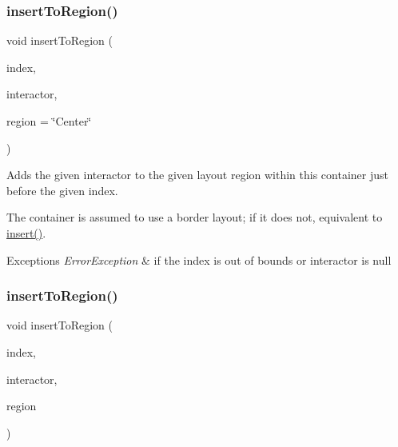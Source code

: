 \subsubsection{\texorpdfstring{insert\+To\+Region()}{insertToRegion()}\hspace{0.1cm}{\footnotesize\ttfamily [2/4]}}
{\footnotesize\ttfamily void insert\+To\+Region (\begin{DoxyParamCaption}\item[{int}]{index,  }\item[{\mbox{\hyperlink{classGInteractor}{G\+Interactor}} $\ast$}]{interactor,  }\item[{const std\+::string \&}]{region = {\ttfamily \char`\"{}Center\char`\"{}} }\end{DoxyParamCaption})\hspace{0.3cm}{\ttfamily [virtual]}}



Adds the given interactor to the given layout region within this container just before the given index. 

The container is assumed to use a border layout; if it does not, equivalent to \mbox{\hyperlink{classGContainer_afffb8f789ff9a8466fbae5b846a0ebe7}{insert()}}. 
\begin{DoxyExceptions}{Exceptions}
{\em Error\+Exception} & if the index is out of bounds or interactor is null \\
\hline
\end{DoxyExceptions}
\mbox{\label{classGContainer_a1be2b263cd8d28e61e136a19d8e935cc}} 
\subsubsection{\texorpdfstring{insert\+To\+Region()}{insertToRegion()}\hspace{0.1cm}{\footnotesize\ttfamily [3/4]}}
{\footnotesize\ttfamily void insert\+To\+Region (\begin{DoxyParamCaption}\item[{int}]{index,  }\item[{\mbox{\hyperlink{classGInteractor}{G\+Interactor}} \&}]{interactor,  }\item[{\mbox{\hyperlink{classGContainer_a81a01a86de31071a92e6cce0bab9bc4b}{Region}}}]{region }\end{DoxyParamCaption})\hspace{0.3cm}{\ttfamily [virtual]}}



